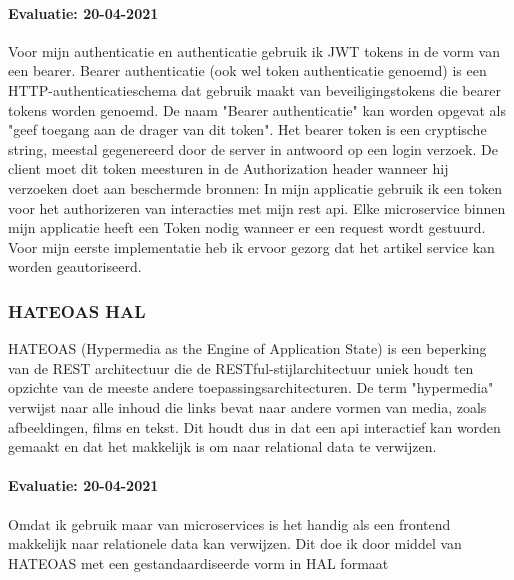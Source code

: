 \paragraph{Evaluatie: 20-04-2021}
Voor mijn authenticatie en authenticatie gebruik ik JWT tokens in de vorm van een bearer.
Bearer authenticatie (ook wel token authenticatie genoemd) is een HTTP-authenticatieschema dat gebruik maakt van beveiligingstokens die bearer tokens worden genoemd.
De naam "Bearer authenticatie" kan worden opgevat als "geef toegang aan de drager van dit token".
Het bearer token is een cryptische string, meestal gegenereerd door de server in antwoord op een login verzoek.
De client moet dit token meesturen in de Authorization header wanneer hij verzoeken doet aan beschermde bronnen:
In mijn applicatie gebruik ik een token voor het authorizeren van interacties met mijn rest api.
Elke microservice binnen mijn applicatie heeft een Token nodig wanneer er een request wordt gestuurd.
Voor mijn eerste implementatie heb ik ervoor gezorg dat het artikel service kan worden geautoriseerd.


\subsubsection{HATEOAS HAL}
HATEOAS (Hypermedia as the Engine of Application State) is een beperking van de REST architectuur die de RESTful-stijlarchitectuur uniek houdt ten opzichte van de meeste andere toepassingsarchitecturen.
De term "hypermedia" verwijst naar alle inhoud die links bevat naar andere vormen van media, zoals afbeeldingen, films en tekst.
Dit houdt dus in dat een api interactief kan worden gemaakt en dat het makkelijk is om naar relational data te verwijzen.
\paragraph{Evaluatie: 20-04-2021}
Omdat ik gebruik maar van microservices is het handig als een frontend makkelijk naar relationele data kan verwijzen.
Dit doe ik door middel van HATEOAS met een gestandaardiseerde vorm in HAL formaat





\newpage
